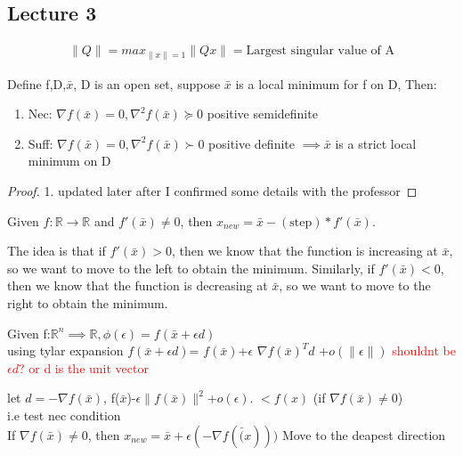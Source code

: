 
% 
\subsection{Lecture 3}

\begin{definition}
    \begin{align*}
        \|Q\|=max_{\|x\|=1}\|Qx\|= \text{Largest singular value of A}
    \end{align*}
\end{definition}

\begin{definition}[]
    Define f,D,$\bar{x}$, D is an open set, suppose $\bar{x}$ is a local minimum for f on D,
    Then:
    \begin{enumerate}
        \item Nec: $\nabla f(\bar{x})=0,\nabla^2f(\bar{x}) \succeq 0
        $ positive semidefinite
        \item Suff: $\nabla f(\bar{x})=0,\nabla^2f(\bar{x}) \succ 0
        $ positive definite $\implies \bar{x}$ is a strict local minimum on D

    \end{enumerate}


\end{definition}

\begin{proof}
    1. updated later after I confirmed some details with the professor
\end{proof}

\begin{problem}
    Given $f: \mathbb{R}\rightarrow \mathbb{R}$ and $f'(\bar{x})\neq 0$, then $x_{new}=\bar{x}-(\text{step})*f'(\bar{x})$.
    
    The idea is that if $f'(\bar x) > 0$, then we know that the function is increasing at $\bar x$, so we want to move to the left to obtain the minimum. Similarly, if $f'(\bar x) < 0$, then we know that the function is decreasing at $\bar x$, so we want to move to the right to obtain the minimum.
\end{problem}

\begin{problem}
    Given f:$\mathbb{R}^n \implies \mathbb{R}, \phi(\epsilon)=f(\bar{x}+\epsilon d)$ 
    \\ using tylar expansion 
    $f(\bar{x}+\epsilon d)$=
    $f(\bar{x})$+$\epsilon$ $\nabla f(\bar{x})^T d$ +$o(\|\epsilon\|)$ \textcolor{red}{shouldnt be $\epsilon d$? or d is the unit vector}

    let $d=-\nabla f(\bar{x})$, f($\bar{x}$)-$\epsilon \| f(\bar{x})\|^2$+$o(\epsilon)$.
    $<f(x)$ (if $\nabla f(\bar{x})\neq 0$)
    \\ i.e test nec condition 
    \\ If $\nabla f(\bar{x})\neq 0$, then $x_{new}=\bar{x}+\epsilon(-\nabla f(\bar(x)))$
    Move to the deapest direction


    
\end{problem}

